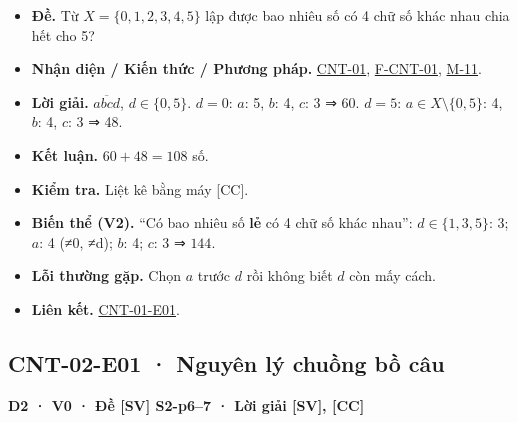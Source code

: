 \documentclass[
  10pt,
  twoside,openany]{book}
\providecommand{\tightlist}{%
  \setlength{\itemsep}{0pt}\setlength{\parskip}{0pt}}
\begin{document}
\begin{itemize}
\tightlist
\item
  \textbf{Đề.} Từ \(X=\{0,1,2,3,4,5\}\) lập được bao nhiêu số có 4 chữ
  số khác nhau chia hết cho 5?
\item
  \textbf{Nhận diện / Kiến thức / Phương pháp.}
  \protect\hyperlink{CNT-01}{CNT-01},
  \protect\hyperlink{F-CNT-01}{F-CNT-01},
  \protect\hyperlink{M-11}{M-11}.
\item
  \textbf{Lời giải.} \(\overline{abcd}\), \(d\in\{0,5\}\). \(d=0\):
  \(a\): 5, \(b\): 4, \(c\): 3 ⇒ 60. \(d=5\):
  \(a\in X\setminus\{0,5\}\): 4, \(b\): 4, \(c\): 3 ⇒ 48.
\item
  \textbf{Kết luận.} \(60+48=108\) số.
\item
  \textbf{Kiểm tra.} Liệt kê bằng máy {[}CC{]}.
\item
  \textbf{Biến thể (V2).} ``Có bao nhiêu số \textbf{lẻ} có 4 chữ số khác
  nhau'': \(d\in\{1,3,5\}\): 3; \(a\): 4 (≠0, ≠d); \(b\): 4; \(c\): 3 ⇒
  \(144\).
\item
  \textbf{Lỗi thường gặp.} Chọn \(a\) trước \(d\) rồi không biết \(d\)
  còn mấy cách.
\item
  \textbf{Liên kết.} \protect\hyperlink{CNT-01-E01}{CNT-01-E01}.
\end{itemize}

\hypertarget{CNT-02-E01}{%
\subsection{CNT-02-E01 · Nguyên lý chuồng bồ câu}\label{CNT-02-E01}}

\textbf{D2 · V0 · Đề {[}SV{]} S2-p6--7 · Lời giải {[}SV{]}, {[}CC{]}}
\end{document}

